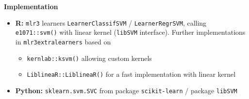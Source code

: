 \documentclass[11pt,compress,t,notes=noshow, xcolor=table]{beamer}
\newcommand{\highlight}[1]{\textcolor{hlcol}{\textbf{#1}}}
\begin{document}
\begin{frame2}
\highlight{Implementation} 
\begin{itemize}
  \item \textbf{R:} \texttt{mlr3} learners \texttt{LearnerClassifSVM} /
  \texttt{LearnerRegrSVM}, calling \texttt{e1071::svm()} with linear kernel (\texttt{libSVM} interface).
  Further implementations in \texttt{mlr3extralearners} based on
  \begin{itemize}
      \item \texttt{kernlab::ksvm()} allowing custom kernels
      \item \texttt{LiblineaR::LiblineaR()} for a fast implementation with linear kernel
  \end{itemize}
  \item \textbf{Python:} \texttt{sklearn.svm.SVC} from package 
  \texttt{scikit-learn} / package \texttt{libSVM}
\end{itemize}
\end{frame2}
\end{document}
